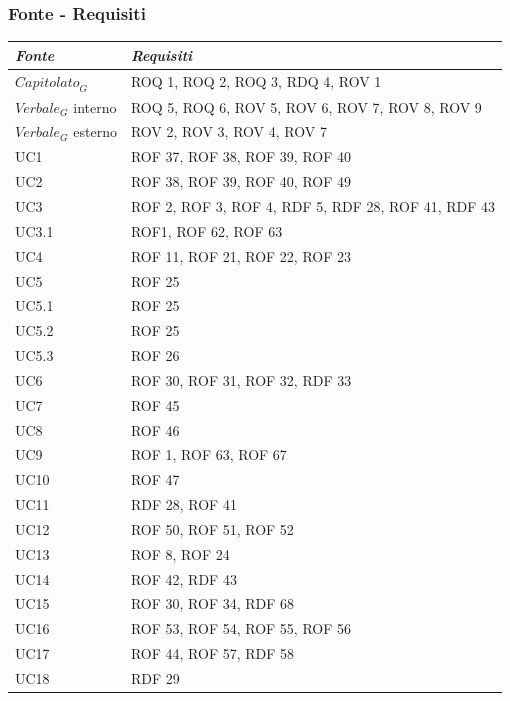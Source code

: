 \documentclass[12pt, oneside]{article}
\begin{document}
\subsubsection{Fonte - Requisiti}
\begin{longtable}{|p{4cm}|p{12cm}|}
    \hline
    \emph{Fonte} & \emph{Requisiti}\\
    \hline
    \endfirsthead
    \endhead
    $\textit{Capitolato}_G$ & ROQ 1, ROQ 2, ROQ 3, RDQ 4, ROV 1 \\
    \hline
    $\textit{Verbale}_G$ interno & ROQ 5, ROQ 6, ROV 5, ROV 6, ROV 7, ROV 8, ROV 9 \\
    \hline
    $\textit{Verbale}_G$ esterno & ROV 2, ROV 3, ROV 4, ROV 7 \\
    \hline
    UC1 & ROF 37, ROF 38, ROF 39, ROF 40 \\
    \hline
    UC2 & ROF 38, ROF 39, ROF 40, ROF 49  \\
    \hline
    UC3 & ROF 2, ROF 3, ROF 4, RDF 5, RDF 28, ROF 41, RDF 43 \\
    \hline 
    UC3.1 & ROF1, ROF 62, ROF 63 \\
    \hline
    UC4 & ROF 11, ROF 21, ROF 22, ROF 23 \\
    \hline
    UC5 & ROF 25 \\
    \hline
    UC5.1 & ROF 25 \\
    \hline
    UC5.2 & ROF 25 \\
    \hline
    UC5.3 & ROF 26 \\
    \hline
    UC6 & ROF 30, ROF 31, ROF 32, RDF 33 \\
    \hline
    UC7 & ROF 45  \\
    \hline
    UC8 & ROF 46 \\
    \hline
    UC9 & ROF 1, ROF 63, ROF 67 \\
    \hline
    UC10 & ROF 47 \\
    \hline
    UC11 & RDF 28, ROF 41 \\
    \hline
    UC12 & ROF 50, ROF 51, ROF 52 \\
    \hline
    UC13 & ROF 8, ROF 24 \\
    \hline
    UC14 & ROF 42, RDF 43 \\
    \hline
    UC15 & ROF 30, ROF 34, RDF 68 \\
    \hline
    UC16 & ROF 53, ROF 54, ROF 55, ROF 56 \\
    \hline
    UC17 & ROF 44, ROF 57, RDF 58 \\
    \hline
    UC18 & RDF 29 \\

\end{longtable}
\end{document}
